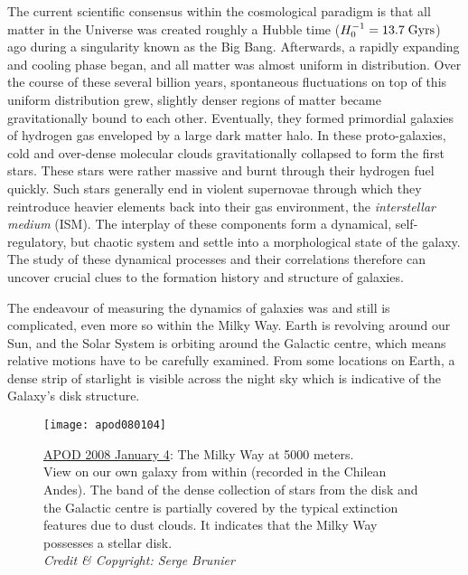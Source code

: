 
The current scientific consensus within the cosmological paradigm is that all
matter in the Universe was created roughly a Hubble time ($H_{0}^{-1} =
13.7\;\mathrm{Gyrs}$) ago during a singularity known as the Big Bang.  Afterwards, a
rapidly expanding and cooling phase began, and all matter was almost uniform in
distribution.  Over the course of these several billion years, spontaneous
fluctuations on top of this uniform distribution grew, slightly denser regions
of matter became gravitationally bound to each other.  Eventually, they formed
primordial galaxies of hydrogen gas enveloped by a large dark matter halo.  In
these proto-galaxies, cold and over-dense molecular clouds gravitationally
collapsed to form the first stars.  These stars were rather massive and burnt
through their hydrogen fuel quickly.  Such stars generally end in violent
supernovae through which they reintroduce heavier elements back
into their gas environment, the \textit{interstellar medium} (ISM).  The
interplay of these components form a dynamical, self-regulatory, but chaotic
system and settle into a morphological state of the galaxy.  The study of these
dynamical processes and their correlations therefore can uncover crucial clues
to the formation history and structure of galaxies. 

The endeavour of measuring the dynamics of galaxies was and still is
complicated, even more so within the Milky Way.  Earth is revolving around our
Sun, and the Solar System is orbiting around the Galactic centre, which means
relative motions have to be carefully examined.  From some locations on Earth, a
dense strip of starlight is visible across the night sky which is indicative of
the Galaxy's disk structure.

\begin{figure}[h]
    \texttt{[image: apod080104]}
    \caption[The Milky Way: APOD 2008 January
    4]{\href{https://apod.nasa.gov/apod/ap080104.html}{APOD 2008 January 4}: The
    Milky Way at 5000 meters.\\
    View on our own galaxy from within (recorded in the Chilean Andes).  The
    band of the dense collection of stars from the disk and the Galactic centre
    is partially covered by the typical extinction features due to dust
    clouds.  It indicates that the Milky Way possesses a stellar disk.\\
    \textit{Credit \& Copyright: Serge Brunier}}
\end{figure}

